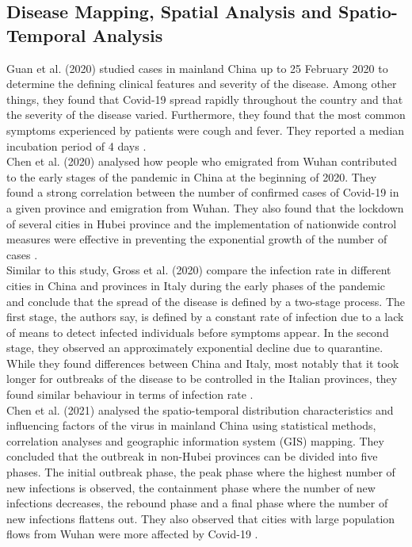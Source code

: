 \subsection*{Disease Mapping, Spatial Analysis and Spatio-Temporal Analysis}
Guan et al. (2020) studied cases in mainland China up to 25 February 2020 to determine the defining clinical features and severity of the disease. Among other things, they found that Covid-19 spread rapidly throughout the country and that the severity of the disease varied. Furthermore, they found that the most common symptoms experienced by patients were cough and fever. They reported a median incubation period of 4 days \autocite[][]{guan2020clinical}. \\
Chen et al. (2020) analysed how people who emigrated from Wuhan contributed to the early stages of the pandemic in China at the beginning of 2020. They found a strong correlation between the number of confirmed cases of Covid-19 in a given province and emigration from Wuhan. They also found that the lockdown of several cities in Hubei province and the implementation of nationwide control measures were effective in preventing the exponential growth of the number of cases \autocite[][]{chen2020distribution}. \\
Similar to this study, Gross et al. (2020) compare the infection rate in different cities in China and provinces in Italy during the early phases of the pandemic and conclude that the spread of the disease is defined by a two-stage process. The first stage, the authors say, is defined by a constant rate of infection due to a lack of means to detect infected individuals before symptoms appear. In the second stage, they observed an approximately exponential decline due to quarantine. While they found differences between China and Italy, most notably that it took longer for outbreaks of the disease to be controlled in the Italian provinces, they found similar behaviour in terms of infection rate \autocite[][]{gross2020spatio}. \\
Chen et al. (2021) analysed the spatio-temporal distribution characteristics and influencing factors of the virus in mainland China using statistical methods, correlation analyses and geographic information system (GIS) mapping. They concluded that the outbreak in non-Hubei provinces can be divided into five phases. The initial outbreak phase, the peak phase where the highest number of new infections is observed, the containment phase where the number of new infections decreases, the rebound phase and a final phase where the number of new infections flattens out. They also observed that cities with large population flows from Wuhan were more affected by Covid-19 \autocite[][]{chen2021spatio}. \\
